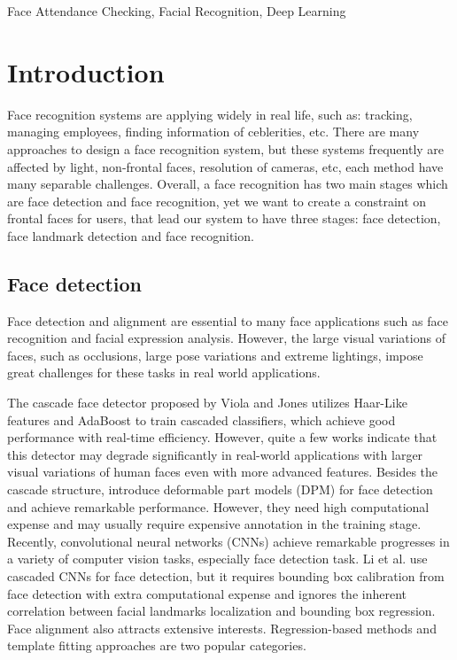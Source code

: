 \documentclass[journal, twocolumn]{IEEEtran}
\begin{document}
\begin{IEEEkeywords}
Face Attendance Checking, Facial Recognition, Deep Learning
\end{IEEEkeywords}


\IEEEpeerreviewmaketitle


\section{Introduction}
\label{introduction}

Face recognition systems are applying widely in real life, such as: tracking, managing employees, finding information of ceblerities, etc. There are many approaches to design a face recognition system, but these systems frequently are affected by light, non-frontal faces, resolution of cameras, etc, each method have many separable challenges. Overall, a face recognition has two main stages which are face detection and face recognition, yet we want to create a constraint on frontal faces for users, that lead our system to have three stages: face detection, face landmark detection and face recognition.  


\subsection{Face detection}
Face detection and alignment are essential to many face applications such as face recognition and facial expression analysis. However, the large visual variations of faces, such as occlusions, large pose variations and extreme lightings, impose
great challenges for these tasks in real world applications.

The cascade face detector proposed by Viola and Jones \cite{ref:detect-1} utilizes Haar-Like features and AdaBoost to train cascaded classifiers, which achieve good performance with real-time
efficiency. However, quite a few works \cite{ref:detect-2}\cite{ref:detect-3}\cite{ref:detect-4} indicate that this detector may degrade significantly in real-world applications with larger visual variations of human faces even with more advanced features. Besides the cascade structure, \cite{ref:detect-5}\cite{ref:detect-6}\cite{ref:detect-7} introduce deformable part models (DPM) for face detection and achieve remarkable performance. However, they need high computational expense and may usually require expensive annotation in the training stage. Recently, convolutional neural networks (CNNs) achieve remarkable progresses in a variety of computer vision tasks, especially face detection task. Li et al. \cite{ref:detect-8} use cascaded CNNs for face detection, but it requires bounding box calibration from face detection with extra computational expense and ignores the inherent correlation between facial landmarks localization and bounding box regression. Face alignment also attracts extensive interests. Regression-based methods \cite{ref:detect-9}\cite{ref:detect-10}\cite{ref:detect-11} and template fitting approaches \cite{ref:detect-12}\cite{ref:detect-13}\cite{ref:detect-7} are two popular categories.
\end{document}
